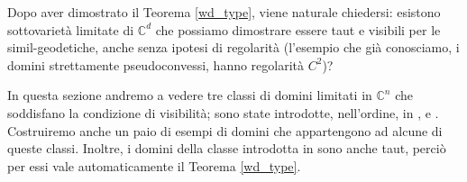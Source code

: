 Dopo aver dimostrato il Teorema \ref{wd_type}, viene naturale chiedersi: esistono sottovarietà limitate di $\mathbb{C}^d$ che possiamo dimostrare essere taut e visibili per le simil-geodetiche, anche senza ipotesi di regolarità (l'esempio che già conosciamo, i domini strettamente pseudoconvessi, hanno regolarità $C^2$)?

In questa sezione andremo a vedere tre classi di domini limitati in $\mathbb{C}^n$ che soddisfano la condizione di visibilità; sono state introdotte, nell'ordine, in \cite{BZ1}, \cite{BM} e \cite{CMS}. Costruiremo anche un paio di esempi di domini che appartengono ad alcune di queste classi. Inoltre, i domini della classe introdotta in \cite{BM} sono anche taut, perciò per essi vale automaticamente il Teorema \ref{wd_type}.